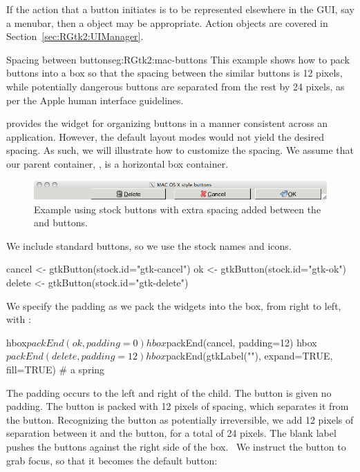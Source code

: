 If the action that a button initiates is to be represented elsewhere
in the GUI, say a menubar, then a  object may be
appropriate. Action objects are covered in
Section~\ref{sec:RGtk2:UIManager}.

\begin{example}{Spacing between buttons}{eg:RGtk2:mac-buttons}
This example shows how to pack buttons into a box so that the spacing
between the similar buttons is 12 pixels, while potentially dangerous
buttons are separated from the rest by 24 pixels, as per the Apple human
interface guidelines.  

\GTK\/ provides the widget  for organizing
buttons in a manner consistent across an application. However, the
default layout modes would not yield the desired spacing. As such, we
will illustrate how to customize the spacing.  We assume that our
parent container, , is a horizontal box container.


\begin{figure}
  \centering
  \includegraphics[width=.85\textwidth]{ex-RGtk2-mac-buttons}
  \caption{Example using stock buttons with extra spacing added between the  and  buttons.}
  \label{fig:ex-RGtk2-mac-buttons}
\end{figure}

We include standard buttons, so we use the stock names and icons.
\begin{Schunk}
\begin{Sinput}
 cancel <- gtkButton(stock.id="gtk-cancel")
 ok <- gtkButton(stock.id="gtk-ok")
 delete <- gtkButton(stock.id="gtk-delete")
\end{Sinput}
\end{Schunk}

We specify the padding as we pack the widgets into the box, from right
to left, with :
\begin{Schunk}
\begin{Sinput}
 hbox$packEnd(ok, padding=0)
 hbox$packEnd(cancel, padding=12)
 hbox$packEnd(delete, padding=12)
 hbox$packEnd(gtkLabel(""), expand=TRUE, fill=TRUE) # a spring
\end{Sinput}
\end{Schunk}
%
The padding occurs to the left and right of the child.  The 
button is given no padding. The  button is packed with 12
pixels of spacing, which separates it from the 
button. Recognizing the  button as potentially
irreversible, we add 12 pixels of separation between it and the
 button, for a total of 24 pixels. The blank label pushes
the buttons against the right side of the box.~  We instruct the
 button to grab focus, so that it becomes the default
button:
\begin{Schunk}
\end{Schunk}







\end{example}
